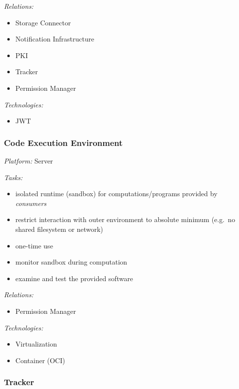 \documentclass[12pt,english,a4paper,titlepage,cleardoublepage=empty,dottedtoc]{report}
\providecommand{\tightlist}{%
  \setlength{\itemsep}{0pt}\setlength{\parskip}{0pt}}
\begin{document}
\emph{Relations:}

\begin{itemize}
\tightlist
\item
  Storage Connector
\item
  Notification Infrastructure
\item
  PKI
\item
  Tracker
\item
  Permission Manager
\end{itemize}

\emph{Technologies:}

\begin{itemize}
\tightlist
\item
  JWT
\end{itemize}

\subsubsection*{Code Execution
Environment}\label{code-execution-environment}

\emph{Platform:} Server

\emph{Tasks:}

\begin{itemize}
\tightlist
\item
  isolated runtime (sandbox) for computations/programs provided by
  \emph{consumers}
\item
  restrict interaction with outer environment to absolute minimum
  (e.g.~no shared filesystem or network)
\item
  one-time use
\item
  monitor sandbox during computation
\item
  examine and test the provided software
\end{itemize}

\emph{Relations:}

\begin{itemize}
\tightlist
\item
  Permission Manager
\end{itemize}

\emph{Technologies:}

\begin{itemize}
\tightlist
\item
  Virtualization
\item
  Container (OCI)
\end{itemize}

\subsubsection*{Tracker}\label{tracker}
\end{document}
